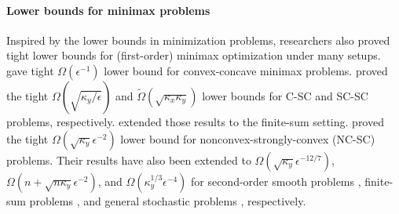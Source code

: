 \documentclass{article}
\begin{document}
\paragraph{Lower bounds for minimax problems} Inspired by the lower bounds in minimization problems, researchers also proved tight lower bounds for (first-order) minimax optimization under many setups. 
\citet{nemirovski2004prox} gave tight $\Omega(\epsilon^{-1})$ lower bound for convex-concave minimax problems. \citet{ouyang2021lower,zhang2022lower} proved the tight 
 $\Omega(\sqrt{\kappa_y/ \epsilon})$ and
$\tilde \Omega(\sqrt{\kappa_x \kappa_y})$
 lower bounds for C-SC and SC-SC problems, respectively.
\citet{han2024lower} extended those results to the finite-sum setting.
\citet{li2021complexity,zhang2021complexity} proved the tight $\Omega(\sqrt{\kappa_y} \epsilon^{-2})$ lower bound for nonconvex-strongly-convex (NC-SC) problems.
Their results have also been extended to
$\Omega(\sqrt{\kappa_y} \epsilon^{-12/7})$, $\Omega(n + \sqrt{n \kappa_y} \epsilon^{-2})$, and  
$\Omega(\kappa_y^{1/3} \epsilon^{-4})$ for 
second-order smooth problems \citep{wang2024efficient},
finite-sum problems \citep{zhang2021complexity}, and 
general stochastic problems \citep{li2021complexity}, respectively.
\end{document}
